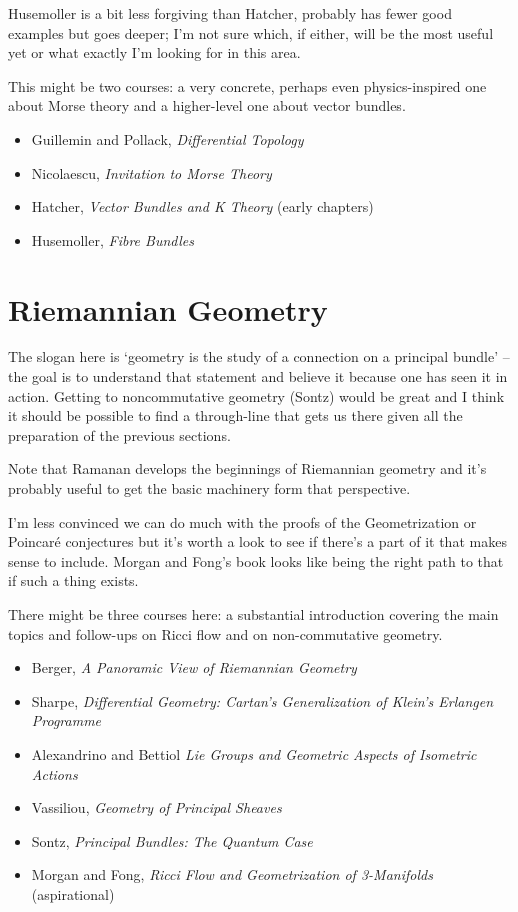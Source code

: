 \documentclass[article]{article}
\begin{document}
Husemoller is a bit less forgiving than Hatcher, probably has fewer good examples but goes deeper; I'm not sure which, if either, will be the most useful yet or what exactly I'm looking for in this area.

This might be two courses: a very concrete, perhaps even physics-inspired one about Morse theory and a higher-level one about vector bundles.

\begin{itemize}
	\item[]{Guillemin and Pollack, \textit{Differential Topology}}
	\item[]{Nicolaescu, \textit{Invitation to Morse Theory}}
	\item[]{Hatcher, \textit{Vector Bundles and K Theory} (early chapters)}
	\item[]{Husemoller, \textit{Fibre Bundles}}
\end{itemize}

\section{Riemannian Geometry}

The slogan here is `geometry is the study of a connection on a principal bundle' -- the goal is to understand that statement and believe it because one has seen it in action. Getting to noncommutative geometry (Sontz) would be great and I think it should be possible to find a through-line that gets us there given all the preparation of the previous sections. 

Note that Ramanan develops the beginnings of Riemannian geometry and it's probably useful to get the basic machinery form that perspective.

I'm less convinced we can do much with the proofs of the Geometrization or Poincar\'e conjectures but it's worth a look to see if there's a part of it that makes sense to include. Morgan and Fong's book looks like being the right path to that if such a thing exists.

There might be three courses here: a substantial introduction covering the main topics and follow-ups on Ricci flow and on non-commutative geometry.

\begin{itemize}
	\item[]{Berger, \textit{A Panoramic View of Riemannian Geometry}}
	\item[]{Sharpe, \textit{Differential Geometry: Cartan's Generalization of Klein's Erlangen Programme}}
	\item{Alexandrino and Bettiol \textit{Lie Groups and Geometric Aspects of Isometric Actions}}
	\item[]{Vassiliou, \textit{Geometry of Principal Sheaves}}
	\item[]{Sontz, \textit{Principal Bundles: The Quantum Case}}
	\item[]{Morgan and Fong, \textit{Ricci Flow and Geometrization of 3-Manifolds} (aspirational)}
\end{itemize}
\end{document}
